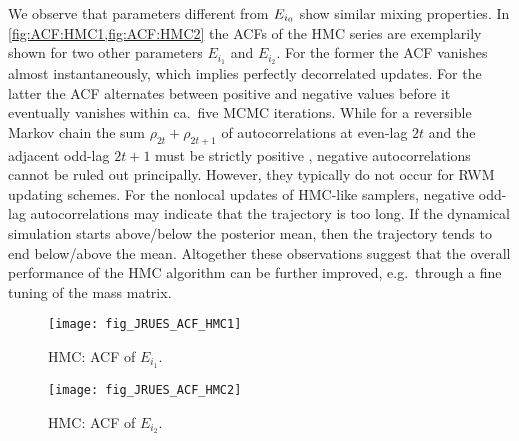 \par %
We observe that parameters different from \(E_{i_0}\) show similar mixing properties.
In \cref{fig:ACF:HMC1,fig:ACF:HMC2} the ACFs of the HMC series are exemplarily shown for two other parameters \(E_{i_1}\) and \(E_{i_2}\).
For the former the ACF vanishes almost instantaneously, which implies perfectly decorrelated updates.
For the latter the ACF alternates between positive and negative values before it eventually vanishes within ca.\ five MCMC iterations.
While for a reversible Markov chain the sum \(\rho_{2t} + \rho_{2t+1}\) of autocorrelations at even-lag \(2t\) and the adjacent odd-lag \(2t+1\) must be strictly positive \cite{MCMC:Geyer1992},
negative autocorrelations cannot be ruled out principally.
However, they typically do not occur for RWM updating schemes.
For the nonlocal updates of HMC-like samplers, negative odd-lag autocorrelations may indicate that the trajectory is too long.
If the dynamical simulation starts above/below the posterior mean, then the trajectory tends to end below/above the mean.
Altogether these observations suggest that the overall performance of the HMC algorithm can be further improved, e.g.\ through a fine tuning of the mass matrix.
\begin{figure}[ht]
  \begin{minipage}[b]{0.49\linewidth}
    \centering
    \texttt{[image: fig\_JRUES\_ACF\_HMC1]}
    \caption[HMC: ACF of \(E_{i_1}\)]{HMC: ACF of \(E_{i_1}\).}
    \label{fig:ACF:HMC1}
  \end{minipage}%
  \hfill
  \begin{minipage}[b]{0.49\linewidth}
    \centering
    \texttt{[image: fig\_JRUES\_ACF\_HMC2]}
    \caption[HMC: ACF of \(E_{i_2}\)]{HMC: ACF of \(E_{i_2}\).}
    \label{fig:ACF:HMC2}
  \end{minipage}%
\end{figure}
